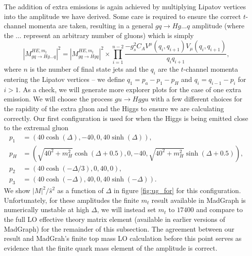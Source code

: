 The addition of extra emissions is again achieved by multiplying Lipatov vertices into the amplitude we have derived. Some care is required to ensure the correct $t$-channel momenta are taken, resulting in a general $gq\to Hg...q$ amplitude (where the ... represent an arbitrary number of gluons) which is simply
\begin{equation}
|M_{gq \to Hg...q}^{HE,m_t}|^2 = |M_{gq \to Hgq}^{HE,m_t}|^2 \times \prod_{i=1}^{n-2} \frac{-g_s^2C_A V^\mu(q_i, q_{i+1}) V_\mu(q_i, q_{i+1})}{q_i q_{i+1}},
\end{equation}
where $n$ is the number of final state jets and the $q_i$ are the $t$-channel momenta entering the Lipatov vertices -- we define $q_1 = p_a - p_1 -p_H$ and $q_i = q_{i-1} - p_i$ for $i >1$. As a check, we will generate more explorer plots for the case of one extra emission. We will choose the process $gu \to Hggu$ with a few different choices for the rapidity of the extra gluon and the Higgs to ensure we are calculating correctly. Our first configuration is used for when the Higgs is being emitted close to the extremal gluon
\begin{subequations}
\begin{align}
p_1 &= (40 \cosh(\Delta),-40,0,40 \sinh(\Delta)), \\
p_H &= (\sqrt{40^2+m_H^2} \cosh(\Delta+0.5), 0,-40,\sqrt{40^2+m_H^2}  \sinh(\Delta+0.5)), \\
p_2 &= (40 \cosh(-\Delta/3),0,40,0), \\
p_3 &= (40 \cosh(-\Delta),40,0,40 \sinh(-\Delta)).
\end{align}
\end{subequations}
We show $|M|^2/\hat{s}^2$ as a function of $\Delta$ in figure \ref{fig:ug_for} for this configuration. Unfortunately, for these amplitudes the finite $m_t$ result available in MadGraph is numerically unstable at high $\Delta$, we will instead set $m_t$ to $17400$ and compare to the full LO effective theory matrix element (available in earlier versions of MadGraph) for the remainder of this subsection. The agreement between our result and MadGrah's finite top mass LO calculation before this point serves as evidence that the finite quark mass element of the amplitude is correct.  
